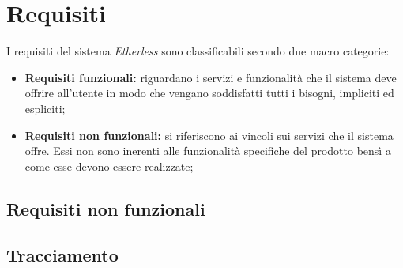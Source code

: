 \section{Requisiti}
I requisiti del sistema \textit{Etherless} sono classificabili secondo due macro categorie:
\begin{itemize}
	\item \textbf{Requisiti funzionali:} riguardano i servizi e funzionalità che il sistema deve offrire all'utente in modo che vengano soddisfatti tutti i bisogni, impliciti ed espliciti;
	\item \textbf{Requisiti non funzionali:} si riferiscono ai vincoli sui servizi che il sistema offre. Essi non sono inerenti alle funzionalità specifiche del prodotto bensì a come esse devono essere realizzate;
\end{itemize}


\newpage
\subsection{Requisiti non funzionali}

\newpage


\newpage
\subsection{Tracciamento}



